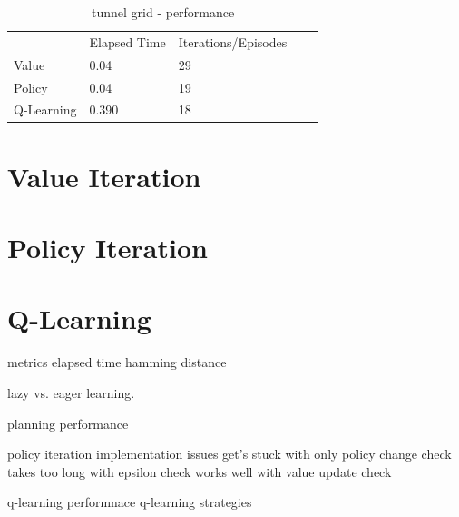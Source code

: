 \documentclass{sig-alternate}
\begin{document}
    \begin{table}[h]
    \begin{tabular}{lllll}
               & Elapsed Time & Iterations/Episodes &  &  \\
    Value      & 0.04         & 29                  &  &  \\
    Policy     & 0.04         & 19                  &  &  \\
    Q-Learning & 0.390        & 18                  &  & 
    \end{tabular}
    \caption{tunnel grid - performance\label{tunnel-performance}}
    \end{table}

\section{Value Iteration}


\section{Policy Iteration}

\section{Q-Learning}

metrics
    elapsed time
    hamming distance

lazy vs. eager learning.

planning performance

policy iteration implementation issues
    get's stuck with only policy change check
    takes too long with epsilon check
    works well with value update check


q-learning performnace
q-learning strategies










\end{document}
